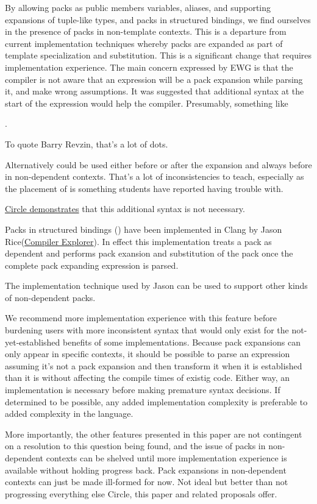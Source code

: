 \documentclass{wg21}
\begin{document}
By allowing packs as public members variables, aliases, and supporting expansions of tuple-like types,
and packs in structured bindings, we find ourselves in the presence of packs in non-template contexts.
This is a departure from current implementation techniques whereby packs are expanded as part of template specialization and substitution.
This is a significant change that requires implementation experience.
The main concern expressed by EWG is that the compiler is not aware that an expression will be a pack expansion while parsing it,
and make wrong assumptions.
It was suggested that additional syntax at the start of the expression would help the compiler. Presumably, something like

.

To quote Barry Revzin, that's a lot of dots.

Alternatively  could be used either before or after the expansion and always before in non-dependent contexts. That's a lot of inconsistencies to teach, especially as the placement of  is something students have reported having trouble with.

\href{https://godbolt.org/z/9ef4r69Wh}{Circle demonstrates} that this additional syntax is not necessary.

Packs in structured bindings () have been implemented in Clang by Jason Rice(\href{https://godbolt.org/z/Tnz4e1dY9}{Compiler Explorer}). In effect this implementation treats a pack as dependent and performs
pack exansion and substitution of the pack once the complete pack expanding expression is parsed.

The implementation technique used by Jason can be used to support other kinds of non-dependent packs.

We recommend more implementation experience with this feature before burdening users with more inconsistent syntax
that would only exist for the not-yet-established benefits of some implementations.
Because pack expansions can only appear in specific contexts, it should be possible to parse an expression
assuming it's not a pack expansion and then transform it when it is established than it is without affecting the compile times of existig code.
Either way, an implementation is necessary before making premature syntax decisions.
If determined to be possible, any added implementation complexity is preferable to added complexity in the language.

More importantly, the other features presented in this paper are not contingent on a resolution to this question being found, and the issue of packs in non-dependent contexts can be shelved until more implementation experience is available without holding progress back.
Pack expansions in non-dependent contexts can just be made ill-formed for now. Not ideal but better than not progressing everything else Circle, this paper and related proposals offer.
\end{document}
